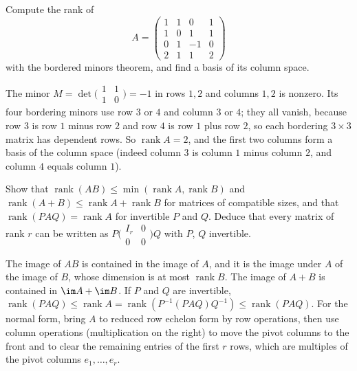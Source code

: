 \begin{exercise}\label{linear-algebra:exercise-bordered-practice}
Compute the rank of
\[
A = \begin{pmatrix}1 & 1 & 0 & 1\\ 1 & 0 & 1 & 1\\ 0 & 1 & -1 & 0\\ 2 & 1 & 1 & 2\end{pmatrix}
\]
with the bordered minors theorem, and find a basis of its column space.
\end{exercise}

\begin{solution}
The minor $M = \det\bigl(\begin{smallmatrix}1 & 1\\ 1 & 0\end{smallmatrix}\bigr) = -1$ in rows $1, 2$ and columns $1, 2$ is nonzero. Its four bordering minors use row $3$ or $4$ and column $3$ or $4$; they
all vanish, because row $3$ is row $1$ minus row $2$ and row $4$ is row $1$ plus row $2$, so each bordering $3 \times 3$ matrix has dependent rows. So $\operatorname{rank}A = 2$, and the first two columns
form a basis of the column space (indeed column $3$ is column $1$ minus column $2$, and column $4$ equals column $1$).
\end{solution}

\begin{exercise}\label{linear-algebra:exercise-rank-inequalities}
Show that $\operatorname{rank}(AB) \leq \min(\operatorname{rank}A, \operatorname{rank}B)$ and $\operatorname{rank}(A + B) \leq \operatorname{rank}A + \operatorname{rank}B$ for matrices of compatible sizes,
and that $\operatorname{rank}(PAQ) = \operatorname{rank}A$ for invertible $P$ and $Q$. Deduce that every matrix of rank $r$ can be written as $P\bigl(\begin{smallmatrix}I_r & 0\\ 0 & 0\end{smallmatrix}\bigr)Q$
with $P$, $Q$ invertible.
\end{exercise}

\begin{solution}
The image of $AB$ is contained in the image of $A$, and it is the image under $A$ of the image of $B$, whose dimension is at most $\operatorname{rank}B$. The image of $A + B$ is contained in
$\im A + \im B$. If $P$ and $Q$ are invertible, $\operatorname{rank}(PAQ) \leq \operatorname{rank}A = \operatorname{rank}(P^{-1}(PAQ)Q^{-1}) \leq \operatorname{rank}(PAQ)$. For the normal form, bring $A$ to
reduced row echelon form by row operations, then use column operations (multiplication on the right) to move the pivot columns to the front and to clear the remaining entries of the first $r$ rows,
which are multiples of the pivot columns $e_1, \ldots, e_r$.
\end{solution}

